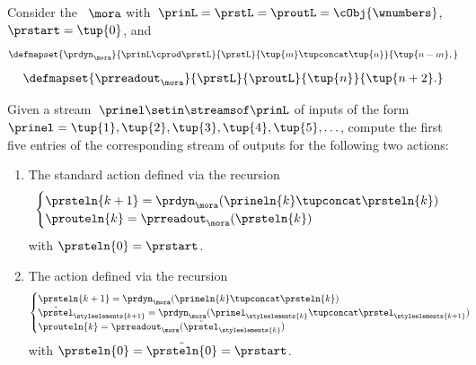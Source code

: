{\begin{gradedexercise}
    \label{ex:ComputingMooreActions}

    Consider the ~$\mora$ with~$\prinL = \prstL = \proutL = \cObj{\wnumbers}$, $\prstart = \tup{0}$, and
    \begin{equation}
        \defmapset{
            \prdyn_\mora
        }{
            \prinL \cprod \prstL
        }{
            \prstL
        }{
            \tup{m} \tupconcat \tup{n}
        }{
            \tup{n - m},
        }
    \end{equation}
    \begin{equation}
        \defmapset{
            \prreadout_\mora
        }{
            \prstL
        }{
            \proutL
        }{
            \tup{n}
        }{
            \tup{n + 2}.
        }
    \end{equation}

    Given a stream~$\prinel \setin \streamsof \prinL$ of inputs of the form~$\prinel = \tup{1}, \tup{2}, \tup{3}, \tup{4}, \tup{5}, \ldots$, compute the first five entries of the corresponding stream of outputs for the following two actions:
    \begin{enumerate}
        \item The standard action defined via the recursion
              \begin{equation}
                  \begin{cases}
                      \prsteln{k+1} = \prdyn_\mora(\prineln{k} \tupconcat \prsteln{k}) \\
                      \prouteln{k} = \prreadout_\mora(\prsteln{k})
                  \end{cases}
              \end{equation}
              with $\prsteln{0} = \prstart$.
        \item The action defined via the recursion
              \begin{equation}
                  \begin{cases}
                      \prsteln{k+1} = \prdyn_\mora(\prineln{k} \tupconcat \prsteln{k})                                                           \\
                      \tilde{\prstel}_{\styleelements{k+1}} = \prdyn_\mora(\prinel_{\styleelements{k}} \tupconcat \prstel_{\styleelements{k+1}}) \\
                      \prouteln{k}   = \prreadout_\mora(\tilde{\prstel}_{\styleelements{k}})
                  \end{cases}
              \end{equation}
              with $\prsteln{0} = \tilde{\prsteln{0}} = \prstart$.
    \end{enumerate}
\end{gradedexercise}

}
